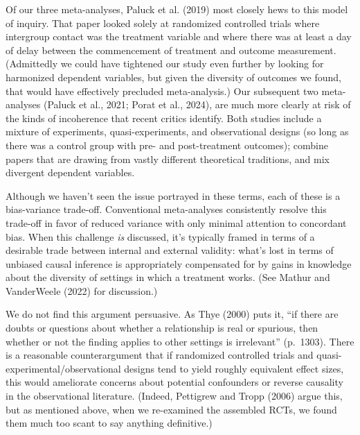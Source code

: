 \documentclass[
  man]{apa6}
\begin{document}
Of our three meta-analyses, Paluck et al. (2019) most closely hews to this model of inquiry. That paper looked solely at randomized controlled trials where intergroup contact was the treatment variable and where there was at least a day of delay between the commencement of treatment and outcome measurement. (Admittedly we could have tightened our study even further by looking for harmonized dependent variables, but given the diversity of outcomes we found, that would have effectively precluded meta-analysis.) Our subsequent two meta-analyses (Paluck et al., 2021; Porat et al., 2024), are much more clearly at risk of the kinds of incoherence that recent critics identify. Both studies include a mixture of experiments, quasi-experiments, and observational designs (so long as there was a control group with pre- and post-treatment outcomes); combine papers that are drawing from vastly different theoretical traditions, and mix divergent dependent variables.

Although we haven't seen the issue portrayed in these terms, each of these is a bias-variance trade-off. Conventional meta-analyses consistently resolve this trade-off in favor of reduced variance with only minimal attention to concordant bias. When this challenge \emph{is} discussed, it's typically framed in terms of a desirable trade between internal and external validity: what's lost in terms of unbiased causal inference is appropriately compensated for by gains in knowledge about the diversity of settings in which a treatment works. (See Mathur and VanderWeele (2022) for discussion.)

We do not find this argument persuasive. As Thye (2000) puts it, ``if there are doubts or questions about whether a relationship is real or spurious, then whether or not the finding applies to other settings is irrelevant'' (p.~1303). There is a reasonable counterargument that if randomized controlled trials and quasi-experimental/observational designs tend to yield roughly equivalent effect sizes, this would ameliorate concerns about potential confounders or reverse causality in the observational literature. (Indeed, Pettigrew and Tropp (2006) argue this, but as mentioned above, when we re-examined the assembled RCTs, we found them much too scant to say anything definitive.)
\end{document}
